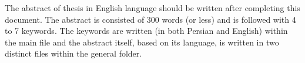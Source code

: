 
The abstract of thesis in English language should be written after completing this document. The abstract is consisted of 300 words (or less) and is followed with 4 to 7 keywords. The keywords are written (in both Persian and English) within the main file and the abstract itself, based on its language, is written in two distinct files within the general folder.
